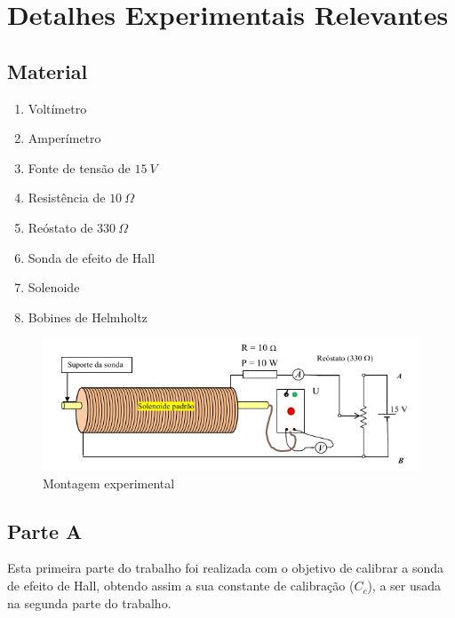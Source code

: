 
\chapter{Detalhes Experimentais Relevantes}
\label{ch:detalhes-experimentais-relevantes}
{
\section{Material}
\label{subsec:detalhes-experimentais-relevantes-material}

\begin{enumerate}
    \item Voltímetro
    \item Amperímetro
    \item Fonte de tensão de $15~V$
    \item Resistência de $10~\Omega$
    \item Reóstato de $330~\Omega$
    \item Sonda de efeito de Hall
    \item Solenoide
    \item Bobines de Helmholtz
\end{enumerate}

\begin{figure}[H]
    \centering
    \includegraphics[width=1\linewidth]{images/esquema-montagem-experimental.png}
    \caption{Montagem experimental}
    \label{fig:detalhes-experimentais-relevantes-montagem-experimental}
\end{figure}

\pagebreak

\section{Parte A}
\label{sec:detalhes-experimentais-relevantes-parte1}

Esta primeira parte do trabalho foi realizada com o objetivo de calibrar a sonda de efeito de Hall, obtendo assim a sua constante de calibração ($C_c$), a ser usada na segunda parte do trabalho.

}
